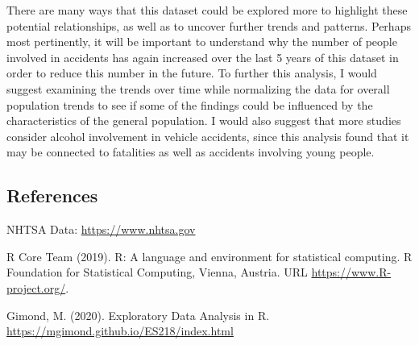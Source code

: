 \documentclass[]{article}
\begin{document}
There are many ways that this dataset could be explored more to
highlight these potential relationships, as well as to uncover further
trends and patterns. Perhaps most pertinently, it will be important to
understand why the number of people involved in accidents has again
increased over the last 5 years of this dataset in order to reduce this
number in the future. To further this analysis, I would suggest
examining the trends over time while normalizing the data for overall
population trends to see if some of the findings could be influenced by
the characteristics of the general population. I would also suggest that
more studies consider alcohol involvement in vehicle accidents, since
this analysis found that it may be connected to fatalities as well as
accidents involving young people.

\hypertarget{references}{%
\subsection{References}\label{references}}

NHTSA Data: \url{https://www.nhtsa.gov}

R Core Team (2019). R: A language and environment for statistical
computing. R Foundation for Statistical Computing, Vienna, Austria. URL
\url{https://www.R-project.org/}.

Gimond, M. (2020). Exploratory Data Analysis in R.
\url{https://mgimond.github.io/ES218/index.html}
\end{document}

